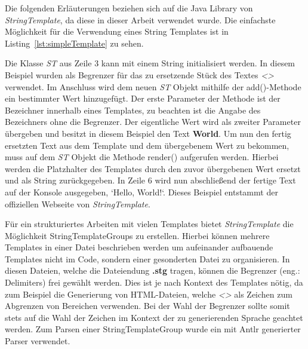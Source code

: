 Die folgenden Erläuterungen beziehen sich auf die Java Library von \textit{StringTemplate}, da diese in dieser Arbeit verwendet wurde.
Die einfachste Möglichkeit für die Verwendung eines String Templates ist in Listing~\ref{lst:simpleTemplate} zu sehen.



Die Klasse \textit{ST} aus Zeile 3 kann mit einem String initialisiert werden.
In diesem Beispiel wurden als Begrenzer für das zu ersetzende Stück des Textes \textit{<>} verwendet.
Im Anschluss wird dem neuen \textit{ST} Objekt mithilfe der add()-Methode ein bestimmter Wert hinzugefügt.
Der erste Parameter der Methode ist der Bezeichner innerhalb eines Templates, zu beachten ist die Angabe des Bezeichners ohne die Begrenzer.
Der eigentliche Wert wird als zweiter Parameter übergeben und besitzt in diesem Beispiel den Text \textbf{World}.
Um nun den fertig ersetzten Text aus dem Template und dem übergebenem Wert zu bekommen, muss auf dem \textit{ST} Objekt die Methode render() aufgerufen werden.
Hierbei werden die Platzhalter des Templates durch den zuvor übergebenen Wert ersetzt und als String zurückgegeben.
In Zeile 6 wird nun abschließend der fertige Text auf der Konsole ausgegeben, `Hello, World!`.
Dieses Beispiel entstammt der offiziellen Webseite von \textit{StringTemplate}.\cite*{stOrg}

Für ein strukturiertes Arbeiten mit vielen Templates bietet \textit{StringTemplate} die Möglichkeit StringTemplateGroups zu erstellen.
Hierbei können mehrere Templates in einer Datei beschrieben werden um aufeinander aufbauende Templates nicht im Code, sondern einer gesonderten Datei zu organisieren.
In diesen Dateien, welche die Dateiendung \textbf{.stg} tragen, können die Begrenzer (eng.: Delimiters) frei gewählt werden.
Dies ist je nach Kontext des Templates nötig, da zum Beispiel die Generierung von HTML-Dateien, welche \textit{<>} als Zeichen zum Abgrenzen von Bereichen verwenden.
Bei der Wahl der Begrenzer sollte somit stets auf die Wahl der Zeichen im Kontext der zu generierenden Sprache geachtet werden.
Zum Parsen einer StringTemplateGroup wurde ein mit Antlr generierter Parser verwendet.\cite*{stgParser}



